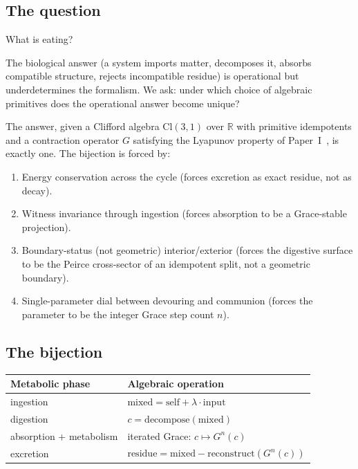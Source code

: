 \documentclass[11pt,a4paper]{article}
\theoremstyle{plain}
\theoremstyle{definition}
\theoremstyle{remark}
\numberwithin{equation}{section}
\providecommand{\Cl}{\mathrm{Cl}}
\providecommand{\R}{\mathbb{R}}
\begin{document}
\subsection*{The question}

What is eating?

The biological answer (a system imports matter, decomposes it,
absorbs compatible structure, rejects incompatible residue) is
operational but underdetermines the formalism. We ask: under
which choice of algebraic primitives does the operational answer
become unique?

The answer, given a Clifford algebra $\Cl(3,1)$ over $\R$ with
primitive idempotents and a contraction operator $G$ satisfying the
Lyapunov property of Paper~I~\cite{paper-I}, is exactly one. The bijection is
forced by:

\begin{enumerate}[label=(\arabic*)]
\item Energy conservation across the cycle (forces excretion as
  exact residue, not as decay).
\item Witness invariance through ingestion (forces absorption to be
  a Grace-stable projection).
\item Boundary-status (not geometric) interior/exterior (forces the
  digestive surface to be the Peirce cross-sector of an idempotent
  split, not a geometric boundary).
\item Single-parameter dial between devouring and communion (forces
  the parameter to be the integer Grace step count $n$).
\end{enumerate}

\subsection*{The bijection}

\begin{center}
\begin{tabular}{ll}
\toprule
\textbf{Metabolic phase} & \textbf{Algebraic operation} \\
\midrule
ingestion & $\mathrm{mixed} = \mathrm{self} + \lambda \cdot \mathrm{input}$ \\
digestion & $c = \mathrm{decompose}(\mathrm{mixed})$ \\
absorption + metabolism & iterated Grace: $c \mapsto G^n(c)$ \\
excretion & $\mathrm{residue} = \mathrm{mixed} - \mathrm{reconstruct}(G^n(c))$ \\
\bottomrule
\end{tabular}
\end{center}
\end{document}
